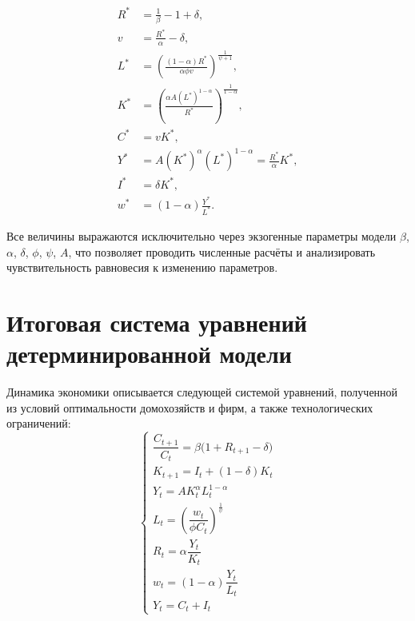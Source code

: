   \[
  \begin{aligned}
  R^* &= \frac{1}{\beta} - 1 + \delta, \\[4pt]
  v &= \frac{R^*}{\alpha} - \delta, \\[4pt]
  L^* &= \left( \frac{(1-\alpha)R^*}{\alpha \phi v} \right)^{\frac{1}{\psi+1}}, \\[4pt]
  K^* &= \left( \frac{\alpha A (L^*)^{1-\alpha}}{R^*} \right)^{\frac{1}{1-\alpha}}, \\[4pt]
  C^* &= v K^*, \\[4pt]
  Y^* &= A (K^*)^{\alpha} (L^*)^{1-\alpha} = \frac{R^*}{\alpha} K^*, \\[4pt]
  I^* &= \delta K^*, \\[4pt]
  w^* &= (1-\alpha)\frac{Y^*}{L^*}.
  \end{aligned}
  \]

  Все величины выражаются исключительно через экзогенные параметры модели $\beta$, $\alpha$, $\delta$, $\phi$, $\psi$, $A$, что позволяет проводить численные расчёты и анализировать чувствительность равновесия к изменению параметров.
  
\section{Итоговая система уравнений детерминированной модели}

Динамика экономики описывается следующей системой уравнений, полученной из условий оптимальности домохозяйств и фирм, а также технологических ограничений:
\begin{equation}
\begin{cases}
\dfrac{C_{t+1}}{C_t} = \beta\bigl(1+R_{t+1} - \delta\bigr) \\[6pt]
K_{t+1} = I_t + (1 - \delta)K_t \\[4pt]
Y_t = A K_t^{\alpha} L_t^{1-\alpha} \\[4pt]
L_t = \left(\dfrac{w_t}{\phi C_t}\right)^{\frac{1}{\psi}} \\[6pt]
R_t = \alpha \dfrac{Y_t}{K_t}\\[6pt]
w_t = (1-\alpha)\dfrac{Y_t}{L_t} \\[6pt]
Y_t = C_t + I_t
\end{cases}
\end{equation}


